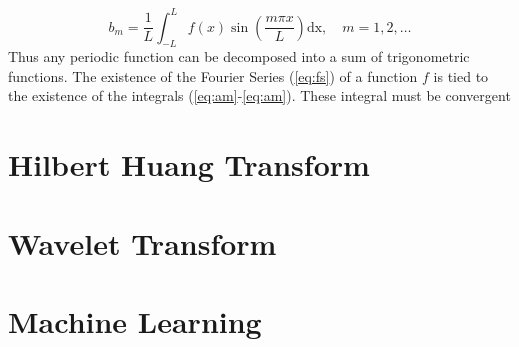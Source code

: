 \documentclass[../Main/thesis.tex]{subfiles}
\begin{document}
\begin{equation}\label{eq:am}
b_{m} = \frac{1}{L}\int_{-L}^{L}f(x)\sin\left(  \frac{m\pi x}{L} \right)\mathrm{dx}, \quad m = 1,2,\dots
\end{equation}
Thus any periodic function can be decomposed into a sum of trigonometric functions. The existence of the Fourier Series (\ref{eq:fs}) of a function $f$ is tied to the 
existence of the integrals (\ref{eq:am}-\ref{eq:am}). These integral must be convergent



\section{Hilbert Huang Transform}
\section{Wavelet Transform}
\section{Machine Learning}
\blankpage
\end{document}
